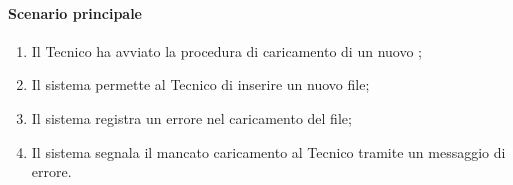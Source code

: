\paragraph*{Scenario principale}
\begin{enumerate}
  \item Il Tecnico ha avviato la procedura di caricamento di un nuovo ;
  \item Il sistema permette al Tecnico di inserire un nuovo file;
  \item Il sistema registra un errore nel caricamento del file;
  \item Il sistema segnala il mancato caricamento al Tecnico tramite un messaggio di errore.  
\end{enumerate}
